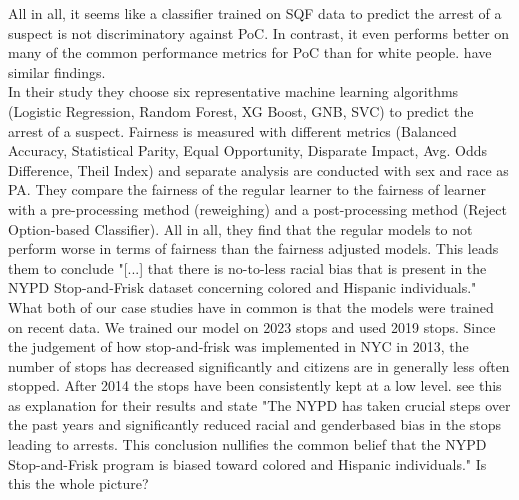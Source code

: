 All in all, it seems like a classifier trained on SQF data to predict the arrest of a suspect is not discriminatory against PoC. In contrast, it even performs better on many of the common performance metrics for PoC than for white people. \cite{Badr2022DTFANSP} have similar findings.\\
In their study they choose six representative machine learning algorithms (Logistic Regression, Random Forest, XG Boost, GNB, SVC) to predict the arrest of a suspect. Fairness is measured with different metrics (Balanced Accuracy, Statistical Parity, Equal Opportunity, Disparate Impact, Avg. Odds Difference, Theil Index) and separate analysis are conducted with sex and race as PA.
They compare the fairness of the regular learner to the fairness of learner with a pre-processing method (reweighing) and a post-processing method (Reject Option-based Classifier). All in all, they find that the regular models to not perform worse in terms of fairness than the fairness adjusted models. This leads them to conclude "[...] that there is no-to-less racial bias that is present in the NYPD Stop-and-Frisk dataset concerning colored and Hispanic individuals."
What both of our case studies have in common is that the models were trained on recent data. We trained our model on 2023 stops and \cite{Badr2022DTFANSP} used 2019 stops. Since the judgement of how stop-and-frisk was implemented in NYC in 2013, the number of stops has decreased significantly and citizens are in generally less often stopped. After 2014 the stops have been consistently kept at a low level.
\cite{Badr2022DTFANSP} see this as explanation for their results and state "The NYPD has taken crucial steps over the past years and significantly reduced racial and genderbased bias in the stops leading to arrests. This conclusion nullifies the common belief that the NYPD Stop-and-Frisk program is biased toward colored and Hispanic individuals." Is this the whole picture?





